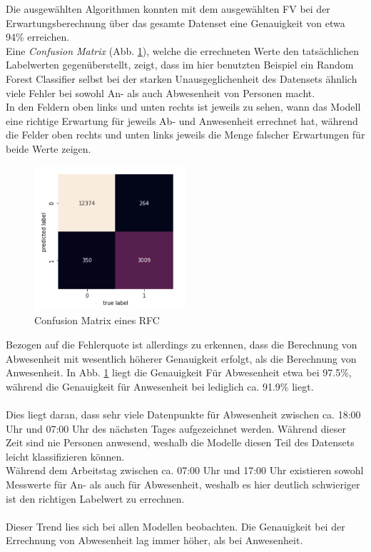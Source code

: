 Die ausgewählten Algorithmen konnten mit dem ausgewählten FV bei der Erwartungsberechnung über das gesamte 
Datenset eine Genauigkeit von etwa 94\% erreichen.\\
Eine \textit{Confusion Matrix} (Abb. \ref{fig:ConMatrix}), welche die errechneten 
Werte den tatsächlichen Labelwerten gegenüberstellt, zeigt, dass im hier benutzten Beispiel ein Random Forest Classifier 
selbst bei der starken Unausgeglichenheit des Datensets ähnlich viele Fehler bei sowohl An- als auch Abwesenheit 
von Personen macht.\\
In den Feldern oben links und unten rechts ist jeweils zu sehen, wann das Modell eine richtige Erwartung 
für jeweils Ab- und Anwesenheit errechnet hat, während die Felder oben rechts und unten links jeweils die 
Menge falscher Erwartungen für beide Werte zeigen.

\begin{figure}[h]
    \centering
    \includegraphics[width=0.5\textwidth]{pic/confusion_matrix.png}
    \caption{Confusion Matrix eines RFC}
    \label{fig:ConMatrix}
\end{figure}

Bezogen auf die Fehlerquote ist allerdings zu erkennen, dass die Berechnung von Abwesenheit mit wesentlich höherer
Genauigkeit erfolgt, als die Berechnung von Anwesenheit. In Abb. \ref{fig:ConMatrix} liegt die Genauigkeit Für
Abwesenheit etwa bei 97.5\%, während die Genauigkeit für Anwesenheit bei lediglich ca. 91.9\% liegt.
\\\\
Dies liegt daran, dass sehr viele Datenpunkte für Abwesenheit zwischen ca. 18:00 Uhr und
07:00 Uhr des nächsten Tages aufgezeichnet werden. Während dieser Zeit sind nie Personen anwesend, 
weshalb die Modelle diesen Teil des Datensets leicht klassifizieren können.\\
Während dem Arbeitstag zwischen ca. 07:00 Uhr und 17:00 Uhr existieren sowohl Messwerte für An- als auch für 
Abwesenheit, weshalb es hier deutlich schwieriger ist den richtigen Labelwert zu errechnen.\\\\
Dieser Trend lies sich bei allen Modellen beobachten. Die Genauigkeit bei der Errechnung von Abwesenheit
lag immer höher, als bei Anwesenheit.

